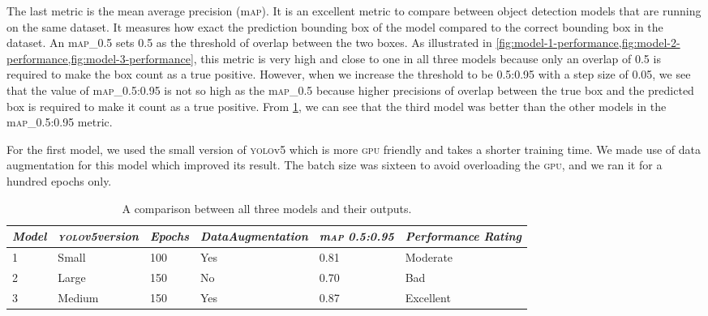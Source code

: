 \documentclass[../main.tex]{subfiles}
\begin{document}
The last metric is the mean average precision (m\textsc{ap}). It is an excellent metric
to compare between object detection models that are running on the same dataset. It measures
how exact the prediction bounding box of the model compared to the correct
bounding box in the dataset. An m\textsc{ap}\_0.5 sets 0.5 as the threshold of overlap 
between the two boxes. As illustrated in 
\cref{fig:model-1-performance,fig:model-2-performance,fig:model-3-performance}, this metric is very high and close to one in all 
three models 
because only an overlap of 0.5 is required to make the box count as a true positive.
However, when we increase the threshold to be 0.5:0.95 with a step size of 0.05, we
see that the value of m\textsc{ap}\_0.5:0.95 is not so high as the m\textsc{ap}\_0.5 because higher precisions of overlap
between the true box and the predicted box is required to make it count as a true
positive. From \cref{tab:model-comparison}, we can see that the third model was better 
than the other models in the m\textsc{ap}\_0.5:0.95 metric.

For the first model, we used the small version of \textsc{yolo}v5 which is 
more \textsc{gpu} friendly and takes a shorter training time.
We made use of data augmentation for this model which improved its result.
The batch size was sixteen to avoid overloading the \textsc{gpu}, 
and we ran it for a hundred epochs only.

\begin{table}[bp]
	\begin{center}
		\caption{A comparison between all three models and their outputs.}
		\label{tab:model-comparison}
                \begin{tabularx}{\textwidth}
                    {p{1.3cm} X X X X X} 
			\toprule
			\textit{Model} & \textit{\textsc{yolo}v5\newline version} & \textit{Epochs} & 
                        \textit{Data\newline Augmentation} & \textit{m\textsc{ap} 0.5:0.95} & \textit{Performance Rating}\\
			\midrule
			 1 & Small & 100 & Yes & 0.81 & Moderate \\
			 2 & Large & 150 & No  & 0.70 & Bad \\
			 3 & Medium& 150 & Yes & 0.87 & Excellent \\		
			\bottomrule
		\end{tabularx}
	\end{center}
\end{table}
\end{document}
